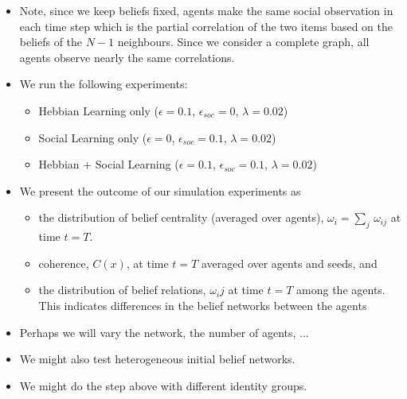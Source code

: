 \documentclass[10pt]{article}
\begin{document}
\begin{itemize}
    \item Note, since we keep beliefs fixed, agents make the same social observation in each time step which is the partial correlation of the two items based on the beliefs of the $N-1$ neighbours. Since we consider a complete graph, all agents observe nearly the same correlations.
    \item We run the following experiments:
    \begin{itemize}
        \item Hebbian Learning only ($\epsilon=0.1$, $\epsilon_{soc}=0$, $\lambda=0.02$)
        \item Social Learning only ($\epsilon=0$, $\epsilon_{soc}=0.1$, $\lambda=0.02$)
        \item Hebbian + Social Learning ($\epsilon=0.1$, $\epsilon_{soc}=0.1$, $\lambda=0.02$)
    \end{itemize}
    \item We present the outcome of our simulation experiments as 
    \begin{itemize}
        \item the distribution of belief centrality (averaged over agents), $\omega_i = \sum_{j} \, \omega_{ij}$ at time $t=T$.
        \item coherence, $C(x)$, at time $t=T$ averaged over agents and seeds, and 
        \item the distribution of belief relations, $\omega_ij$ at time $t=T$ among the agents. This indicates differences in the belief networks between the agents
    \end{itemize}
    \item \TODO Perhaps we will vary the network, the number of agents, ...
    \item \TODO We might also test heterogeneous initial belief networks. 
    \item \TODO We might do the step above with different identity groups.
\end{itemize}

\end{document}
